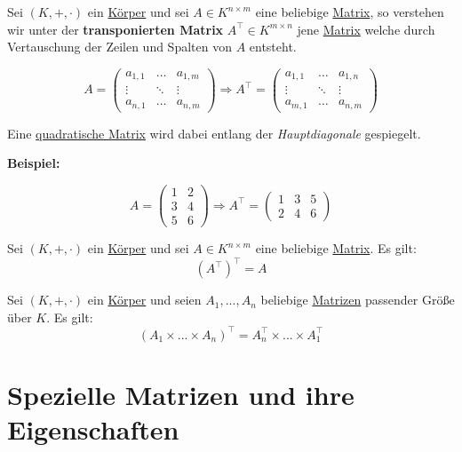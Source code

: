 \documentclass[../../main.tex]{subfiles}
\begin{document}
	\begin{definition}
		\label{def:Transponieren}
		\label{def:transponierteMatrix}
		Sei $(K,+,\cdot)$ ein \hyperref[def:Körper]{Körper} und sei $A\in K^{n \times m}$ eine beliebige \hyperref[def:Matrix]{Matrix}, so verstehen wir unter der \textbf{transponierten Matrix} $A^\top \in K^{m \times n}$ jene \hyperref[def:Matrix]{Matrix} welche durch Vertauschung der Zeilen und Spalten von $A$ entsteht.
		
		$$A = \begin{pmatrix} a_{1,1} & \dots & a_{1,m} \\ \vdots & \ddots & \vdots \\ a_{n,1} & \dots & a_{n,m} \end{pmatrix} \Rightarrow A^\top = \begin{pmatrix} a_{1,1} & \dots & a_{1,n} \\ \vdots & \ddots & \vdots \\ a_{m,1} & \dots & a_{n,m} \end{pmatrix}$$
		
		Eine \hyperref[def:QuadratischeMatrix]{quadratische Matrix} wird dabei entlang der \textit{Hauptdiagonale} gespiegelt. 
		
		\textbf{Beispiel:}
		
		$$A = \begin{pmatrix} 1 & 2 \\ 3 & 4 \\ 5 & 6 \end{pmatrix} \Rightarrow A^\top = \begin{pmatrix} 1 & 3 & 5 \\ 2 & 4 & 6 \end{pmatrix}$$
	\end{definition}

	\begin{theorem}
		Sei $(K,+,\cdot)$ ein \hyperref[def:Körper]{Körper} und sei $A\in K^{n \times m}$ eine beliebige \hyperref[def:Matrix]{Matrix}. Es gilt: $$(A^\top)^\top = A$$
	\end{theorem}

	\begin{theorem}
		Sei $(K,+,\cdot)$ ein \hyperref[def:Körper]{Körper} und seien $A_1,...,A_n$ beliebige \hyperref[def:Matrix]{Matrizen} passender Größe über $K$. Es gilt: $$(A_1 \times ... \times A_n)^\top = A_n^\top \times ... \times A_1^\top$$
	\end{theorem}

	\section{Spezielle Matrizen und ihre Eigenschaften}
	
\end{document}
